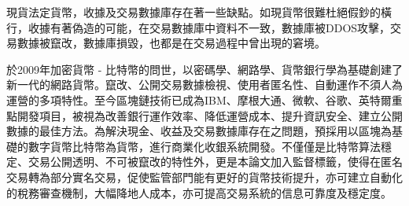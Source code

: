 
現貨法定貨幣，收據及交易數據庫存在著一些缺點。如現貨幣很難杜絕假鈔的橫行，收據有著偽造的可能，在交易數據庫中資料不一致，數據庫被DDOS攻擊，交易數據被竄改，數據庫損毀，也都是在交易過程中曾出現的窘境。

於2009年加密貨幣 - 比特幣的問世，以密碼學、網路學、貨幣銀行學為基礎創建了新一代的網路貨幣。竄改、公開交易數據檢視、使用者匿名性、自動運作不須人為運營的多項特性。至今區塊鏈技術已成為IBM、摩根大通、微軟、谷歌、英特爾重點開發項目，被視為改善銀行運作效率、降低運營成本、提升資訊安全、建立公開數據的最佳方法。為解決現金、收益及交易數據庫存在之問題，預採用以區塊為基礎的數字貨幣比特幣為貨幣，進行商業化收銀系統開發。不僅僅是比特幣算法穩定、交易公開透明、不可被竄改的特性外，更是本論文加入監督標籤，使得在匿名交易轉為部分實名交易，促使監管部門能有更好的貨幣技術提升，亦可建立自動化的稅務審查機制，大幅降地人成本，亦可提高交易系統的信息可靠度及穩定度。
